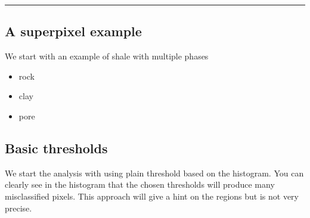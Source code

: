\documentclass[letterpaper,10pt,english]{sphinxmanual}
\begin{document}
\bigskip\hrule\bigskip



\subsection{A super\sphinxhyphen{}pixel example}
\label{\detokenize{05-AdvancedSegmentation:a-super-pixel-example}}
\sphinxAtStartPar
We start with an example of shale with multiple phases
\begin{itemize}
\item {} 
\sphinxAtStartPar
rock

\item {} 
\sphinxAtStartPar
clay

\item {} 
\sphinxAtStartPar
pore

\end{itemize}


\subsection{Basic thresholds}
\label{\detokenize{05-AdvancedSegmentation:basic-thresholds}}
\sphinxAtStartPar
We start the analysis with using plain threshold based on the histogram. You can clearly see in the histogram that the chosen thresholds will produce many misclassified pixels. This approach will give a hint on the regions but is not very precise.
\end{document}
